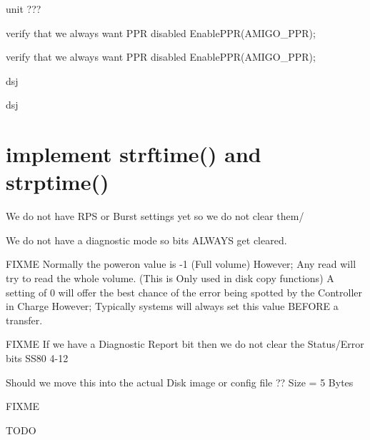 \begin{DoxyRefList}
unit ???  
\item[\label{todo__todo000002}%
\hypertarget{todo__todo000002}{}%
Global \hyperlink{amigo_8h_ab63435382919a7106a374b021861a2e1}{amigo\+\_\+init} (void)]verify that we always want P\+PR disabled Enable\+P\+P\+R(\+A\+M\+I\+G\+O\+\_\+\+P\+P\+R);  
\item[\label{todo__todo000002}%
\hypertarget{todo__todo000002}{}%
Global \hyperlink{amigo_8h_ab63435382919a7106a374b021861a2e1}{amigo\+\_\+init} (void)]verify that we always want P\+PR disabled Enable\+P\+P\+R(\+A\+M\+I\+G\+O\+\_\+\+P\+P\+R);  
\item[\label{todo__todo000003}%
\hypertarget{todo__todo000003}{}%
Global \hyperlink{amigo_8h_afb2f0c0517c5c10c38f8e15b8b281a8c}{amigo\+\_\+request\+\_\+status} (void)]dsj  
\item[\label{todo__todo000003}%
\hypertarget{todo__todo000003}{}%
Global \hyperlink{amigo_8h_afb2f0c0517c5c10c38f8e15b8b281a8c}{amigo\+\_\+request\+\_\+status} (void)]dsj  
\item[\label{todo__todo000001}%
\hypertarget{todo__todo000001}{}%
Global \hyperlink{time_8h_a7ffc52def0c7fbf70c50248e3f7d6a8a}{asctime\+\_\+r} (tm\+\_\+t $\ast$t, char $\ast$buf)]\section*{implement strftime() and strptime() }


\item[\label{todo__todo000059}%
\hypertarget{todo__todo000059}{}%
Global \hyperlink{ss80_8h_aa48ccb1479e226dacfaa1dac15631a9d}{Clear\+\_\+\+Common} (int u)]We do not have R\+PS or Burst settings yet so we do not clear them/ 

We do not have a diagnostic mode so bits A\+L\+W\+A\+YS get cleared. 

F\+I\+X\+ME Normally the poweron value is -\/1 (Full volume) However; Any read will try to read the whole volume. (This is Only used in disk copy functions) A setting of 0 will offer the best chance of the error being spotted by the Controller in Charge However; Typically systems will always set this value B\+E\+F\+O\+RE a transfer. 

F\+I\+X\+ME If we have a Diagnostic Report bit then we do not clear the Status/\+Error bits S\+S80 4-\/12  
\item[\label{todo__todo000023}%
\hypertarget{todo__todo000023}{}%
Global \hyperlink{ss80_8c_a6c2c7eb732e226999d4a4699b3d5ff82}{Controller\+Description} ]Should we move this into the actual Disk image or config file ?? Size = 5 Bytes 
\item[\label{todo__todo000066}%
\hypertarget{todo__todo000066}{}%
Global \hyperlink{fatfs__utils_8h_a97a2409a53057e1a63537f196ff00a50}{fatfs\+\_\+cat} (char $\ast$name)]F\+I\+X\+ME  
\item[\label{todo__todo000017}%
\hypertarget{todo__todo000017}{}%
Global \hyperlink{gpib__task_8h_ac63d4e431ab55dddfbf436d87135128e}{G\+P\+IB} (uint8\+\_\+t ch)]T\+O\+DO 


\end{DoxyRefList}
